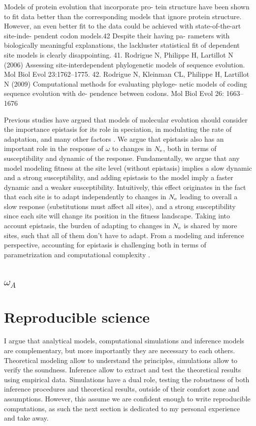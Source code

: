 Models of protein evolution that incorporate pro-
tein structure have been shown to fit data better than the corresponding models that ignore protein structure. However, an even better fit to the data could be achieved with state-of-the-art site-inde- pendent codon models.42 Despite their having pa- rameters with biologically meaningful explanations, the lackluster statistical fit of dependent site models is clearly disappointing.
41. Rodrigue N, Philippe H, Lartillot N (2006) Assessing site-interdependent phylogenetic models of sequence evolution. Mol Biol Evol 23:1762–1775.
42. Rodrigue N, Kleinman CL, Philippe H, Lartillot N (2009) Computational methods for evaluating phyloge- netic models of coding sequence evolution with de- pendence between codons. Mol Biol Evol 26: 1663–1676

Previous studies have argued that models of molecular evolution should consider the importance epistasis for its role in speciation, in modulating the rate of adaptation, and many other factors \citet{Goldstein2017, Miller2018}.
We argue that epistasis also has an important role in the response of $\omega$ to changes in $N_{\textrm{e}}$, both in terms of susceptibility and dynamic of the response.
Fundamentally, we argue that any model modeling fitness at the site level (without epistasis) implies a slow dynamic and a strong susceptibility, and adding epistasis to the model imply a faster dynamic and a weaker susceptibility.
Intuitively, this effect originates in the fact that each site is to adapt independently to changes in $N_{\textrm{e}}$ leading to overall a slow response (substitutions must affect all sites), and a strong susceptibility since each site will change its position in the fitness landscape.
Taking into account epistasis, the burden of adapting to changes in $N_{\textrm{e}}$ is shared by more sites, such that all of them don't have to adapt. 
From a modeling and inference perspective, accounting for epistasis is challenging both in terms of parametrization and computational complexity \citet{Rodrigue2005, Manhart2014}. 

\subsection{$\omega_A$}


\section{Reproducible science}
I argue that analytical models, computational simulations and inference models are complementary, but more importantly they are necessary to each others. 
Theoretical modeling allow to understand the principles, simulations allow to verify the soundness.
Inference allow to extract and test the theoretical results using empirical data.
Simulations have a dual role, testing the robustness of both inference procedures and theoretical results, outside of their comfort zone and assumptions.
However, this assume we are confident enough to write reproducible computations, as such the next section is dedicated to my personal experience and take away.

